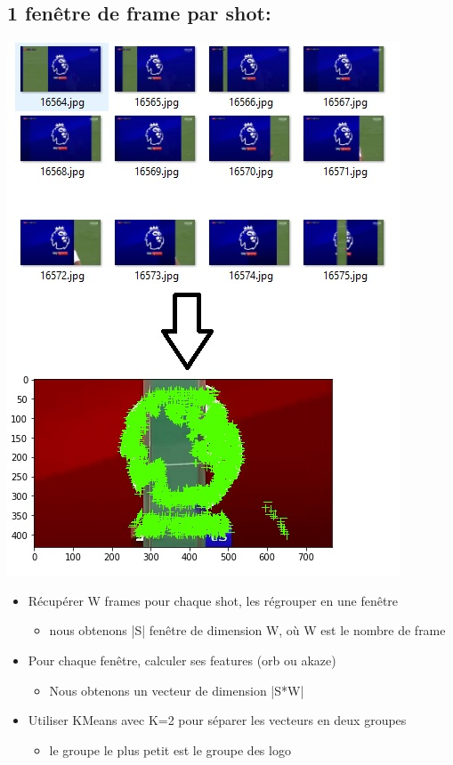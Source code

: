 \documentclass[11pt]{article}
\begin{document}
\subsection{1 fenêtre de frame par shot:}
\label{sec-6-6}
\includegraphics[width=.9\linewidth]{akaze_window_res.JPG}
\begin{itemize}
\item Récupérer W frames pour chaque shot, les régrouper en une fenêtre
\begin{itemize}
\item nous obtenons |S| fenêtre de dimension W, où W est le nombre de frame
\end{itemize}
\item Pour chaque fenêtre, calculer ses features (orb ou akaze) 
\begin{itemize}
\item Nous obtenons un vecteur de dimension |S*W|
\end{itemize}
\item Utiliser KMeans avec K=2 pour séparer les vecteurs en deux groupes 
\begin{itemize}
\item le groupe le plus petit est le groupe des logo
\end{itemize}
\end{itemize}
\end{document}
